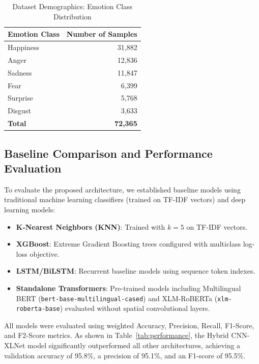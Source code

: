 \documentclass[conference]{IEEEtran}
\begin{document}
\begin{table}[h]
\caption{Dataset Demographics: Emotion Class Distribution}
\label{tab:emotions}
\centering
\begin{tabular}{lr}
\toprule
\textbf{Emotion Class} & \textbf{Number of Samples} \\
\midrule
Happiness & 31,882 \\
Anger & 12,836 \\
Sadness & 11,847 \\
Fear & 6,399 \\
Surprise & 5,768 \\
Disgust & 3,633 \\
\midrule
\textbf{Total} & \textbf{72,365} \\
\bottomrule
\end{tabular}
\end{table}

\subsection{Baseline Comparison and Performance Evaluation}
To evaluate the proposed architecture, we established baseline models using traditional machine learning classifiers (trained on TF-IDF vectors) and deep learning models:
\begin{itemize}
    \item \textbf{K-Nearest Neighbors (KNN)}: Trained with $k=5$ on TF-IDF vectors.
    \item \textbf{XGBoost}: Extreme Gradient Boosting trees configured with multiclass log-loss objective.
    \item \textbf{LSTM/BiLSTM}: Recurrent baseline models using sequence token indexes.
    \item \textbf{Standalone Transformers}: Pre-trained models including Multilingual BERT (\texttt{bert-base-multilingual-cased}) and XLM-RoBERTa (\texttt{xlm-roberta-base}) evaluated without spatial convolutional layers.
\end{itemize}

All models were evaluated using weighted Accuracy, Precision, Recall, F1-Score, and F2-Score metrics. As shown in Table~\ref{tab:performance}, the Hybrid CNN-XLNet model significantly outperformed all other architectures, achieving a validation accuracy of 95.8\%, a precision of 95.1\%, and an F1-score of 95.5\%.
\end{document}
